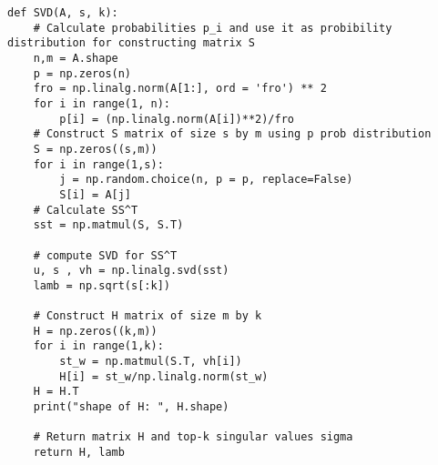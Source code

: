 \usepackage{listings}
\begin{lstlisting}
def SVD(A, s, k):
    # Calculate probabilities p_i and use it as probibility distribution for constructing matrix S
    n,m = A.shape
    p = np.zeros(n)
    fro = np.linalg.norm(A[1:], ord = 'fro') ** 2
    for i in range(1, n):
        p[i] = (np.linalg.norm(A[i])**2)/fro
    # Construct S matrix of size s by m using p prob distribution
    S = np.zeros((s,m))
    for i in range(1,s):
        j = np.random.choice(n, p = p, replace=False)
        S[i] = A[j]
    # Calculate SS^T
    sst = np.matmul(S, S.T)

    # compute SVD for SS^T
    u, s , vh = np.linalg.svd(sst)
    lamb = np.sqrt(s[:k])

    # Construct H matrix of size m by k
    H = np.zeros((k,m))
    for i in range(1,k):
        st_w = np.matmul(S.T, vh[i])
        H[i] = st_w/np.linalg.norm(st_w)
    H = H.T
    print("shape of H: ", H.shape)

    # Return matrix H and top-k singular values sigma
    return H, lamb
\end{lstlisting}

